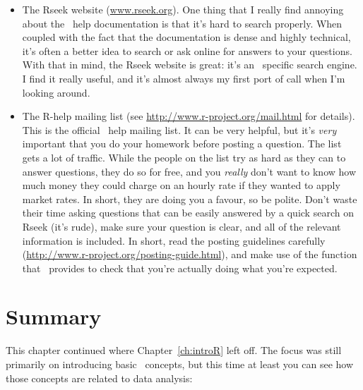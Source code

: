 \begin{itemize}
\item The Rseek website (\url{www.rseek.org}). One thing that I really find annoying about the \R\ help documentation is that it's hard to search properly. When coupled with the fact that the documentation is dense and highly technical, it's often a better idea to search or ask online for answers to your questions. With that in mind, the Rseek website is great: it's an \R\ specific search engine. I find it really useful, and it's almost always my first port of call when I'm looking around.
\item The R-help mailing list (see \url{http://www.r-project.org/mail.html} for details). This is the official \R\ help mailing list. It can be very helpful, but it's {\it very} important that you do your homework before posting a question. The list gets a lot of traffic. While the people on the list try as hard as they can to answer questions, they do so for free, and you {\it really} don't want to know how much money they could charge on an hourly rate if they wanted to apply market rates. In short, they are doing you a favour, so be polite. Don't waste their time asking questions that can be easily answered by a quick search on Rseek (it's rude), make sure your question is clear, and all of the relevant information is included. In short, read the posting guidelines carefully (\url{http://www.r-project.org/posting-guide.html}), and make use of the  function that \R\ provides to check that you're actually doing what you're expected.
\end{itemize}





\section{Summary}

This chapter continued where Chapter~\ref{ch:introR} left off. The focus was still primarily on introducing basic \R\ concepts, but this time at least you can see how those concepts are related to data analysis:

